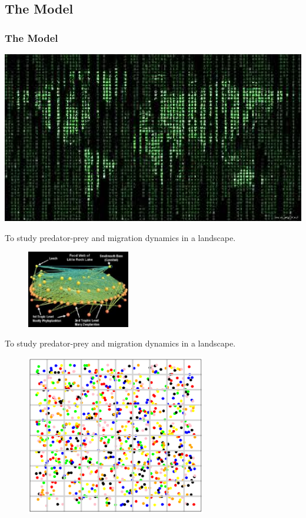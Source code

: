 \documentclass[xcolor=x11names,compress]{beamer}
\renewcommand{\(}{\begin{columns}}
\renewcommand{\)}{\end{columns}}
\newcommand{\<}[1]{\begin{column}{#1}}
\renewcommand{\>}{\end{column}}
\begin{document}
\subsection{The Model}

\begin{frame}
\frametitle{The Model}
\includegraphics[width=1.0\textwidth]{./matrix.eps}
\end{frame}

\begin{frame}
\centering To study predator-prey and migration dynamics in a landscape.
\begin{figure}
\centering \includegraphics[width=0.4\textwidth]{./conectivity_species.eps}
\end{figure}
\end{frame}

\begin{frame}
\centering To study predator-prey and migration dynamics in a landscape.
\begin{figure}
\centering \includegraphics[width=0.7\textwidth]{./occuppiedlattice.eps}
\end{figure}
\end{frame}
\end{document}
